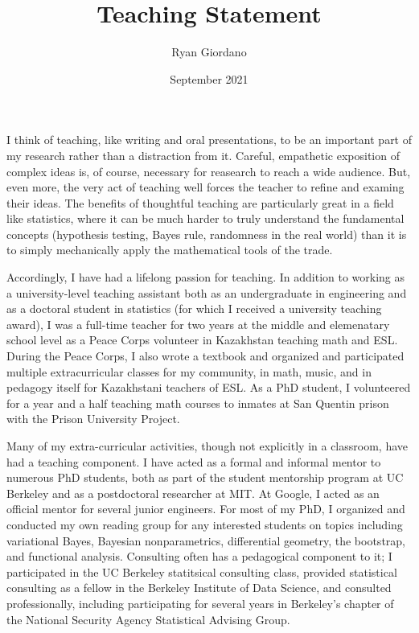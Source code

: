 \documentclass{article}
\title{Teaching Statement}
\author{Ryan Giordano}
\date{September 2021}
\begin{document}
\maketitle

I think of teaching, like writing and oral presentations, to be an important
part of my research rather than a distraction from it.  Careful, empathetic
exposition of complex ideas is, of course, necessary for reasearch to reach a
wide audience.  But, even more, the very act of teaching well forces the teacher
to refine and examing their ideas.  The benefits of thoughtful teaching are
particularly great in a field like statistics, where it can be much harder to
truly understand the fundamental concepts (hypothesis testing, Bayes rule,
randomness in the real world) than it is to simply mechanically apply the
mathematical tools of the trade.

Accordingly, I have had a lifelong passion for teaching.  In addition to working
as a university-level teaching assistant both as an undergraduate in engineering
and as a doctoral student in statistics (for which I received a university
teaching award), I was a full-time teacher for two years at the middle and
elemenatary school level as a Peace Corps volunteer in Kazakhstan teaching math
and ESL.  During the Peace Corps, I also wrote a textbook and organized and
participated multiple extracurricular classes for my community, in math, music,
and in pedagogy itself for Kazakhstani teachers of ESL.  As a PhD student, I
volunteered for a year and a half teaching math courses to inmates at San
Quentin prison with the Prison University Project.

Many of my extra-curricular activities, though not explicitly in a classroom,
have had a teaching component.  I have acted as a formal and informal mentor to
numerous PhD students, both as part of the student mentorship program at UC
Berkeley and as a postdoctoral researcher at MIT.  At Google, I acted as an
official mentor for several junior engineers. For most of my PhD, I organized
and conducted my own reading group for any interested students on topics
including variational Bayes, Bayesian nonparametrics, differential geometry, the
bootstrap, and functional analysis. Consulting often has a pedagogical component
to it; I participated in the UC Berkeley statitsical consulting class, provided
statistical consulting as a fellow in the Berkeley Institute of Data Science,
and consulted professionally, including participating for several years in
Berkeley's chapter of the National Security Agency Statistical Advising Group.
\end{document}
